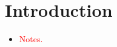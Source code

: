 \documentclass[../main.tex]{subfiles}
\begin{document}
\chapter{Introduction}
\begin{itemize}
    \item {}\textcolor{red}{Notes.}
\end{itemize}
\end{document}
